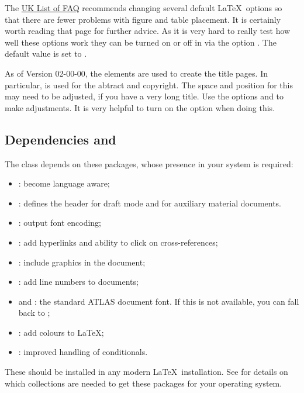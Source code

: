 The
\href{http://www.tex.ac.uk/cgi-bin/texfaq2html?label=floats}{UK List of FAQ}
recommends changing several default \LaTeX\ options so that there are fewer problems
with figure and table placement.
It is certainly worth reading that page for further advice.
As it is very hard to really test how well these options work
they can be turned on or off in  via the option .
The default value is set to .

As of  Version 02-00-00,
the \KOMAScript elements are used to create the title pages.
In particular,  is used for the abtract and copyright.
The space and position for this may need to be adjusted,
if you have a very long title. Use the options
 and  to make adjustments.
It is very helpful to turn on the  option when doing this.


\subsection{Dependencies and }
\label{sec:atlaspackage}

The  class depends on these packages, whose presence in
your system is required:
\begin{itemize}\setlength{\parskip}{0pt}\setlength{\itemsep}{0pt}
\item {}: become language aware;
\item {}: defines the header for draft mode
  and for auxiliary material documents.
\item {}: output font encoding;
\item {}: add hyperlinks and ability to click on cross-references;
\item {}: include graphics in the document;
\item {}: add line numbers to documents;
\item {} and : the standard ATLAS document font.
  If this is not available, you can fall back to ;
\item {}: add colours to \LaTeX;
\item {}: improved handling of conditionals.
\end{itemize}
These should be installed in any modern \LaTeX\ installation.
See \cite{latex-faq} for details on which collections are needed to get these packages
for your operating system.


